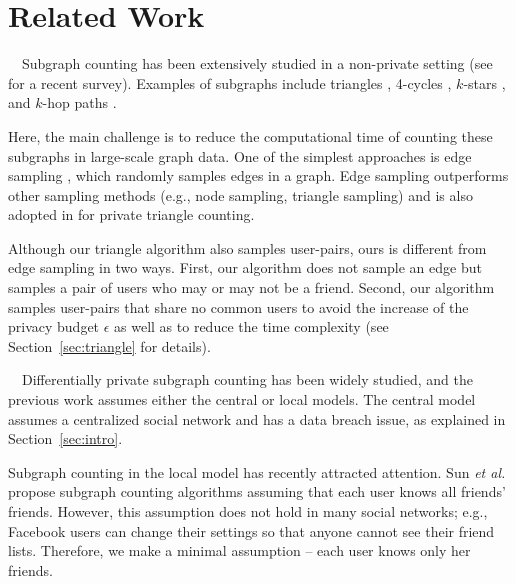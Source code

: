 \section{Related Work}
\label{sec:related}
{}~~Subgraph counting has been extensively studied in a non-private setting (see \cite{Ribeiro_CS21} for a recent survey). 
Examples of subgraphs include triangles \cite{Bera_PODS20,Eden_FOCS15,Kolountzakis_IM12,Wu_TKDE16},  4-cycles \cite{Bera_STACS17,Kallaugher_PODS19,Manjunath_ESA11,McGregor_PODS20}, $k$-stars \cite{Aliakbarpour_Alg18,Gonen_DM11}, and 
$k$-hop paths \cite{Bjorklund_ICALP19,Kartun-Giles_TWC18}. 

Here, the main challenge is to reduce the computational time of counting these subgraphs in large-scale graph data. 
One of the simplest approaches is edge sampling \cite{Bera_PODS20,Eden_FOCS15,Wu_TKDE16}, which randomly 
samples edges in a graph. 
Edge sampling outperforms other sampling methods 
(e.g., node sampling, triangle sampling) \cite{Wu_TKDE16} and is also adopted in \cite{Imola_USENIX22} 
for private triangle counting. 

Although our triangle algorithm also samples user-pairs, ours is different from edge sampling in two ways. 
First, our algorithm does not sample an edge but samples a pair of users who may or may not be a friend. 
Second, our algorithm samples user-pairs that share no common users to avoid the increase of the privacy budget $\epsilon$ as well as to reduce the time complexity 
(see Section~\ref{sec:triangle} for details). 

\smallskip
{}~~Differentially private subgraph counting has been widely studied, and the previous work assumes either the central \cite{Ding_TKDE21,Karwa_PVLDB11,Kasiviswanathan_TCC13} or local \cite{Imola_USENIX21,Imola_USENIX22,Sun_CCS19,Ye_ICDE20,Ye_TKDE21} models. 
The central model assumes a centralized social network and has a data breach issue, as explained in Section~\ref{sec:intro}. 

Subgraph counting in the local model has recently attracted attention. 
Sun \textit{et al.} \cite{Sun_CCS19} propose subgraph counting algorithms 
assuming 
that each user knows all friends' friends. 
However, this assumption does not hold in many social networks; e.g., Facebook users can change their settings so that anyone cannot see their friend lists. 
Therefore, we make a minimal assumption -- each user knows only her friends. 

